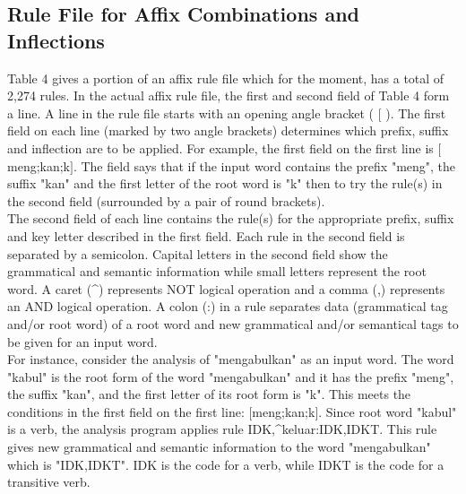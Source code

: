\documentclass[english]{nlp}
\begin{document}
\subsection{Rule File for Affix Combinations and Inflections}
Table 4 gives a portion of an affix rule file which for the moment, 
has a total of 2,274 rules.
In the actual affix rule file, the first and second field of Table 4 form a line.
A line in the rule file starts with an opening angle bracket ( ${[}$ ).
The first field on each line (marked by two angle brackets) determines 
which prefix, suffix and inflection are to be applied. 
For example, the first field on the first line is ${[}$meng;kan;k${]}$.
The field says that if the input word contains the prefix "meng", the suffix
"kan" and the first letter of the root word is "k" then to try
the rule(s) in the second field (surrounded by a pair of round brackets).\\
The second field of each line contains the rule(s) for the appropriate 
prefix, suffix and key letter described in the first field.
Each rule in the second field is separated by a semicolon.
Capital letters in the second field show the grammatical and 
semantic information while small letters represent the root word.
A caret ({\textasciicircum}) represents NOT logical operation and a 
comma (,) represents an AND logical operation. A colon (:) in a rule
separates data (grammatical tag and/or root word) of a root word and 
new grammatical and/or semantical tags to be given for an input word.
\\For instance, consider the analysis of "mengabulkan" as an input word.
The word "kabul" is the root form of the word "mengabulkan" and it has
the prefix "meng", the suffix "kan", and the first letter of its root form
is "k".
This meets the conditions in the first field on the first line: 
${[}$meng;kan;k${]}$.
Since root word "kabul" is a verb, the analysis program applies
rule IDK,{\textasciicircum}keluar:IDK,IDKT.
This rule gives new grammatical and semantic information to 
the word "mengabulkan" which is "IDK,IDKT".
IDK is the code for a verb, while IDKT is the code for a transitive verb.
\vspace{-2mm}
\end{document}
